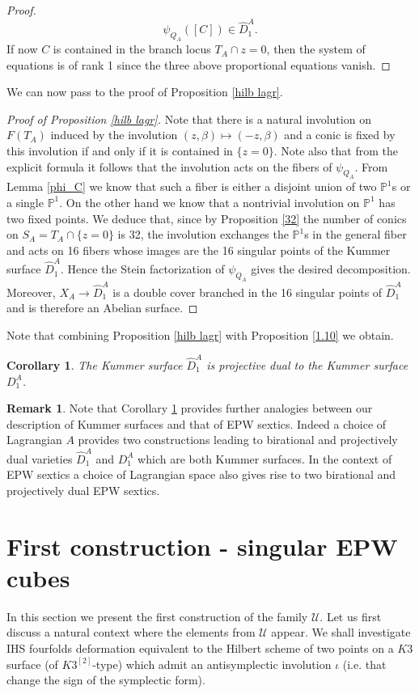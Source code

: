 \documentclass[a4paper,11pt]{amsart}
\newtheorem{cor}[thm]{Corollary}
\theoremstyle{definition}
\newtheorem{rem}[thm]{Remark}
\numberwithin{equation}{section}
\numberwithin{equation}{section} \theoremstyle{definition}
\begin{document}
\begin{proof}
$$\psi_{Q_A}([C])\in \hat{D}_1^A.$$
If now $C$ is contained in the branch locus $T_A\cap {z=0}$, then the system of equations is of rank 1 since the three above proportional equations vanish.
\end{proof}

We can now pass to the proof of Proposition \ref{hilb lagr}.
\begin{proof}[Proof of Proposition \ref{hilb lagr}] Note that there is a natural involution on $F(T_A)$ induced by the involution 
$(z,\beta)\mapsto(-z,\beta)$ and a conic is fixed by this involution if and only if it is contained in $\{z=0\}$. Note also that from the explicit formula it follows that the involution acts on the fibers of  $\psi_{Q_A}$. From Lemma \ref{phi_C} we know that such a fiber is either a disjoint union of two ${{\mathbb{P}}}^1$s or a single ${{\mathbb{P}}}^1$. On the other hand we know that a nontrivial involution on ${{\mathbb{P}}}^1$ has  two fixed points. We deduce that, since by Proposition \ref{32} the number of conics on $S_A=T_A\cap\{z=0\}$ is 32, the involution exchanges the ${{\mathbb{P}}}^1$s  in the general fiber and acts on 16 fibers whose images are the 16 singular points of the Kummer surface $\hat{D}_1^A$. Hence the Stein factorization of  $\psi_{Q_A}$ gives the desired decomposition. Moreover, $X_A\to \hat{D}_1^A$ is a double cover branched in the 16 singular points of $\hat{D}_1^A$ and is therefore an Abelian surface. 
\end{proof}

Note that combining Proposition \ref{hilb lagr} with Proposition \ref{1.10} we obtain.
\begin{cor} \label{projdualKummer} The Kummer surface $\hat{D}_1^A$ is projective dual to the Kummer surface $D_1^A$.
\end{cor}
\begin{rem} Note that Corollary \ref{projdualKummer} provides further analogies between our description of Kummer surfaces and that of EPW sextics. Indeed a choice of Lagrangian $A$ provides two constructions leading to birational and projectively dual varieties $\hat{D}_1^A$ and $D_1^A$ which are both Kummer surfaces. In the context of EPW sextics a choice of Lagrangian space also gives rise to two birational and projectively dual EPW sextics.  
\end{rem}

 
 

\section{First construction - singular EPW cubes}\label{section2}
In this section we present the first construction of the family $\mathcal{U}$.
Let us first discuss a natural context where the elements from $\mathcal{U}$ appear. We shall investigate IHS fourfolds deformation equivalent to the Hilbert scheme of two points on a $K3$ surface (of $K3^{[2]}$-type) which admit an antisymplectic involution $\iota$ (i.e. that change the sign of the symplectic form). 
\end{document}
